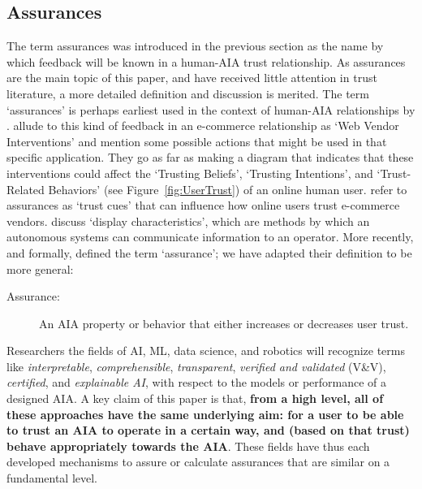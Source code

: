\subsection{Assurances} \label{sec:assurances}
    The term assurances was introduced in the previous section as the name by which feedback will be known in a human-AIA trust relationship. As assurances are the main topic of this paper, and have received little attention in trust literature, a more detailed definition and discussion is merited. The term `assurances' is perhaps earliest used in the context of human-AIA relationships by \citet{Sheridan1984-kx}. \citet{McKnight2001-fa} allude to this kind of feedback in an e-commerce relationship as `Web Vendor Interventions' and mention some possible actions that might be used in that specific application. They go as far as making a diagram that indicates that these interventions could affect the `Trusting Beliefs', `Trusting Intentions', and `Trust-Related Behaviors' (see Figure~\ref{fig:UserTrust}) of an online human user. \citet{Corritore2003-gx} refer to assurances as `trust cues' that can influence how online users trust e-commerce vendors. \citet{Lee2004-pv} discuss `display characteristics', which are methods by which an autonomous systems can communicate information to an operator. More recently, and formally, \citet{Lillard2016-yg} defined the term `assurance'; we have adapted their definition to be more general:    
    \begin{description}
        \item [Assurance:] An AIA property or behavior that either increases or decreases user trust. %
    \end{description}

Researchers the fields of AI, ML, data science, and robotics will recognize terms like \emph{interpretable}, \emph{comprehensible}, \emph{transparent}, \emph{verified and validated} (V\&V), \emph{certified}, and \emph{explainable AI}, with respect to the models or performance of a designed AIA. A key claim of this paper is that, \textbf{from a high level, all of these approaches have the same underlying aim: for a user to be able to trust an AIA to operate in a certain way, and (based on that trust) behave appropriately towards the AIA}. These fields have thus each developed mechanisms to assure or calculate assurances that are similar on a fundamental level. 
